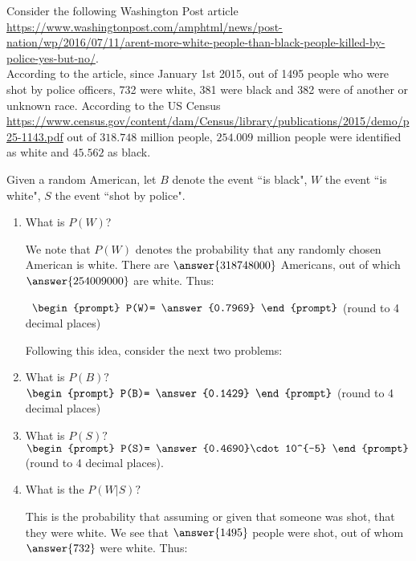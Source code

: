 \documentclass{ximera}
\begin{document}
\begin{question}
Consider  the following Washington Post article  \url{https://www.washingtonpost.com/amphtml/news/post-nation/wp/2016/07/11/arent-more-white-people-than-black-people-killed-by-police-yes-but-no/}.\\

According to the article, since January 1st 2015, out of 1495 people who were shot by police officers, 732 were white,  381 were black and 382 were of another or unknown race.    According to the US Census \url{https://www.census.gov/content/dam/Census/library/publications/2015/demo/p25-1143.pdf} out of $318.748$ million people, $254.009$ million people were identified as white and $45.562$ as black.

Given a random American, let $B$ denote the event ``is black", $W$ the event ``is white", $S$ the event ``shot by police".

\begin{enumerate}
\item What is $P(W)$? 
\begin{explanation}
We note that $P(W)$ denotes the probability that any randomly chosen American is white.  There are $\answer{318748000}$ Americans, out of which $\answer{254009000}$ are white.  Thus:
\end{explanation}



\  $ \begin{prompt}
    P(W)= \answer{0.7969}
  \end{prompt}$ (round to 4 decimal places)
  
  Following this idea, consider the next two problems:
  
\item What is $P(B)?$\ $ \begin{prompt}
    P(B)= \answer{0.1429}
  \end{prompt}$ (round to 4 decimal places)
\item What is $P(S)?$ 
$\begin{prompt}
P(S)= \answer{0.4690}\cdot 10^{-5}
\end{prompt}$ (round to 4 decimal places).



\item What is the $P(W|S)?$ 

This is the probability that assuming or given that someone was shot, that they were white.  We see that $\answer{1495}$ people were shot, out of whom $\answer{732}$ were white.  Thus:



\end{enumerate}
\end{question}
\end{document}
